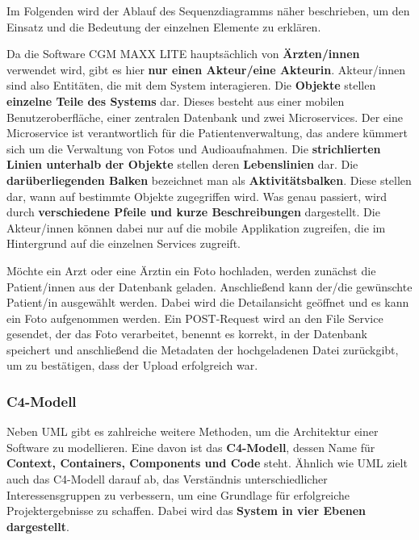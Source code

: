         Im Folgenden wird der Ablauf des Sequenzdiagramms näher beschrieben, um den Einsatz und die Bedeutung der einzelnen Elemente zu erklären. \cite{EA:Web24}

        Da die Software CGM MAXX LITE hauptsächlich von \textbf{Ärzten/innen} verwendet wird, gibt es hier \textbf{nur einen Akteur/eine Akteurin}. Akteur/innen sind also Entitäten, die mit dem System interagieren. Die \textbf{Objekte} stellen \textbf{einzelne Teile des Systems} dar.
        Dieses besteht aus einer mobilen Benutzeroberfläche, einer zentralen Datenbank und zwei Microservices. Der eine Microservice ist verantwortlich für die Patientenverwaltung, das andere kümmert sich um die Verwaltung von Fotos und Audioaufnahmen. Die \textbf{strichlierten Linien unterhalb der Objekte} stellen deren \textbf{Lebenslinien} dar. Die \textbf{darüberliegenden Balken} bezeichnet man als \textbf{Aktivitätsbalken}. Diese stellen dar, wann auf bestimmte Objekte zugegriffen wird.
        Was genau passiert, wird durch \textbf{verschiedene Pfeile und kurze Beschreibungen} dargestellt.
        Die Akteur/innen können dabei nur auf die mobile Applikation zugreifen, die im Hintergrund auf die einzelnen Services zugreift. 

        Möchte ein Arzt oder eine Ärztin ein Foto hochladen, werden zunächst die Patient/innen aus der Datenbank geladen. Anschließend kann der/die gewünschte Patient/in ausgewählt werden. Dabei wird die Detailansicht geöffnet und es kann ein Foto aufgenommen werden. Ein POST-Request wird an den File Service gesendet, der das Foto verarbeitet, benennt es korrekt, in der Datenbank speichert und  anschließend die Metadaten der hochgeladenen Datei zurückgibt, um zu bestätigen, dass der Upload erfolgreich war.
        
        \clearpage
    


    \subsubsection{C4-Modell}

    Neben UML gibt es zahlreiche weitere Methoden, um die Architektur einer Software zu modellieren.
    Eine davon ist das \textbf{C4-Modell}, dessen Name für \textbf{Context, Containers, Components und Code} steht.
    Ähnlich wie UML zielt auch das C4-Modell darauf ab, das Verständnis unterschiedlicher Interessensgruppen zu verbessern, um eine Grundlage für erfolgreiche Projektergebnisse zu schaffen. Dabei wird das \textbf{System in vier Ebenen dargestellt}. 
    \cite{EA:Web25, EA:Web26, EA:Web28}


